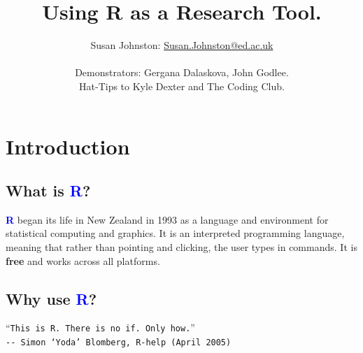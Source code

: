 \documentclass[a4paper,12pt]{article}
\newcommand\boldblue[1]{\textcolor{blue}{\textbf{#1}}}
\begin{document}





\title{Using R as a Research Tool.}
\author{Susan Johnston: \href{mailto:Susan.Johnston@ed.ac.uk}{Susan.Johnston@ed.ac.uk}  \\ \\
        Demonstrators: Gergana Dalaskova, John Godlee. \\
        Hat-Tips to Kyle Dexter and The Coding Club.}









\maketitle



\section {Introduction}

\subsection {What is \boldblue{R}?}

\boldblue{R} began its life in New Zealand in 1993 as a language and environment for statistical computing and graphics. It is an interpreted programming language, meaning that rather than pointing and clicking, the user types in commands. It is \textbf{free} and works across all platforms.


\subsection {Why use \boldblue{R}?}

\begin{center}
``\texttt{This is R. There is no if. Only how.}'' \\
\texttt{{-}{-} Simon `Yoda' Blomberg, R-help (April 2005)}

\end{center}
\end{document}
